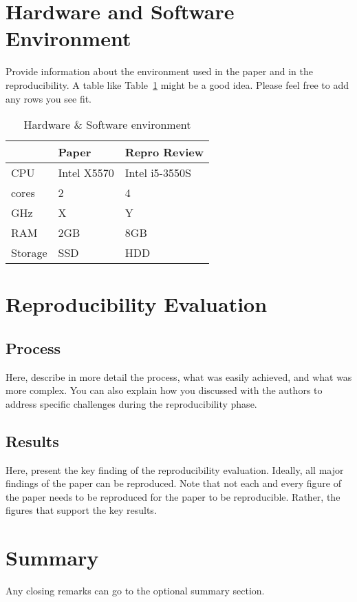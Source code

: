 \documentclass[acmsmall,nonacm]{acmart}
\begin{document}
\section{Hardware and Software Environment}
Provide information about the environment used in the paper and in the reproducibility. A table like Table~\ref{tab:environment} might be a good idea. Please feel free to add any rows you see fit.

\begin{table}[h]
  \caption{Hardware \& Software environment}
  \label{tab:environment}
  \begin{tabular}{lll}
    \toprule
     & Paper & Repro Review\\
    \midrule
    CPU & Intel X5570 & Intel i5-3550S\\
    cores & 2 & 4 \\
    GHz & X & Y \\
    RAM & 2GB & 8GB \\
    Storage & SSD & HDD \\
  \bottomrule
\end{tabular}
\end{table}


\section{Reproducibility Evaluation}

\subsection{Process}
Here, describe in more detail the process, what was easily achieved, and what was more complex. You can also explain how you discussed with the authors to address specific challenges during the reproducibility phase.

\subsection{Results}
Here, present the key finding of the reproducibility evaluation. Ideally, all major findings of the paper can be reproduced. Note that not each and every figure of the paper needs to be reproduced for the paper to be reproducible. Rather, the figures that support the key results. 

\section{Summary}
Any closing remarks can go to the optional summary section.




 
\end{document}
